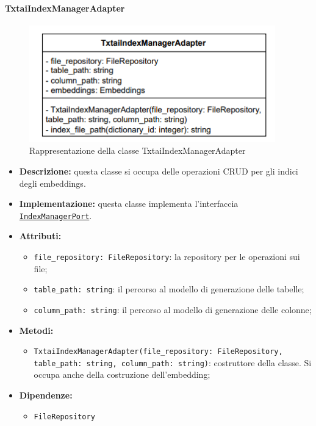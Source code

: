 \paragraph{TxtaiIndexManagerAdapter} \label{TxtaiIndexManagerAdapter}
\begin{figure}[H]
    \centering
    \includegraphics[width=0.95\textwidth]{assets/Backend/txtai_index_manager_adapter.png}
    \caption{Rappresentazione della classe TxtaiIndexManagerAdapter}
  \end{figure}
\begin{itemize}
    \item \textbf{Descrizione:} questa classe si occupa delle operazioni CRUD per gli indici degli embeddings.
    \item \textbf{Implementazione:} questa classe implementa l'interfaccia \hyperref[IndexManagerPort]{\texttt{IndexManagerPort}}.
    \item \textbf{Attributi:}
    \begin{itemize}
        \item \texttt{file\_repository: FileRepository}: la repository per le operazioni sui file;
        \item \texttt{table\_path: string}: il percorso al modello di generazione delle tabelle;
        \item \texttt{column\_path: string}: il percorso al modello di generazione delle colonne;
    \end{itemize}
    \item \textbf{Metodi:}
    \begin{itemize}
        \item \texttt{TxtaiIndexManagerAdapter(file\_repository: FileRepository, table\_path: string, column\_path: string)}: costruttore della classe. Si occupa anche della costruzione dell'embedding;
    \end{itemize}
    \item \textbf{Dipendenze:}
    \begin{itemize}
        \item \texttt{FileRepository}
    \end{itemize}
\end{itemize} 

